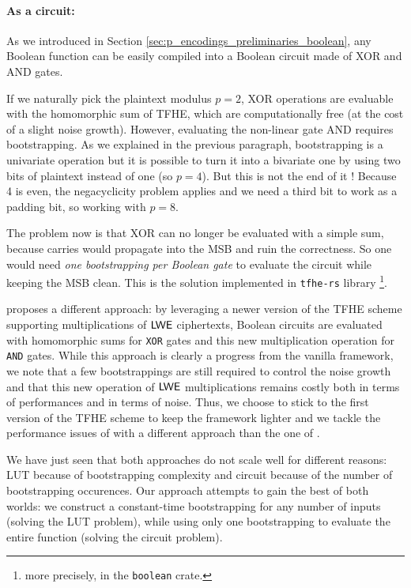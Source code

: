 \paragraph{As a circuit:}

As we introduced in Section \ref{sec:p_encodings_preliminaries_boolean}, any Boolean function can be easily compiled into a Boolean circuit made of XOR and AND gates. 

If we naturally pick the plaintext modulus $p=2$, XOR operations are evaluable with the homomorphic sum of TFHE, which are computationally free (at the cost of a slight noise growth). However, evaluating the non-linear gate AND requires bootstrapping. As we explained in the previous paragraph, bootstrapping is a univariate operation but it is possible to turn it into a bivariate one by using two bits of plaintext instead of one (so $p=4$). But this is not the end of it ! Because 4 is even, the negacyclicity problem applies and we need a third bit to work as a padding bit, so working with $p=8$.

The problem now is that XOR can no longer be evaluated with a simple sum, because carries would propagate into the MSB and ruin the correctness. So one would need \textit{one bootstrapping per Boolean gate} to evaluate the circuit while keeping the MSB clean. This is the solution implemented in \texttt{tfhe-rs} library \cite{tfhe-rs}\footnote{more precisely, in the \texttt{boolean} crate.}. 


\cite{AC:CLOT21} proposes a different approach: by leveraging a newer version of the TFHE scheme supporting multiplications of $\textsf{LWE}$ ciphertexts, Boolean circuits are evaluated with homomorphic sums for \texttt{XOR} gates and this new multiplication operation for \texttt{AND} gates. While this approach is clearly a progress from the vanilla framework, we note that a few bootstrappings are still required to control the noise growth and that this new operation of $\textsf{LWE}$ multiplications remains costly both in terms of performances and in terms of noise. Thus, we choose to stick to the first version of the TFHE scheme to keep the framework lighter and we tackle the performance issues of \cite{JC:CGGI20} with a different approach than the one of \cite{AC:CLOT21}.

\bigskip

We have just seen that both approaches do not scale well for different reasons: LUT because of bootstrapping complexity and circuit because of the number of bootstrapping occurences. Our approach attempts to gain the best of both worlds: we construct a constant-time bootstrapping for any number of inputs (solving the LUT problem), while using only one bootstrapping to evaluate the entire function (solving the circuit problem).

